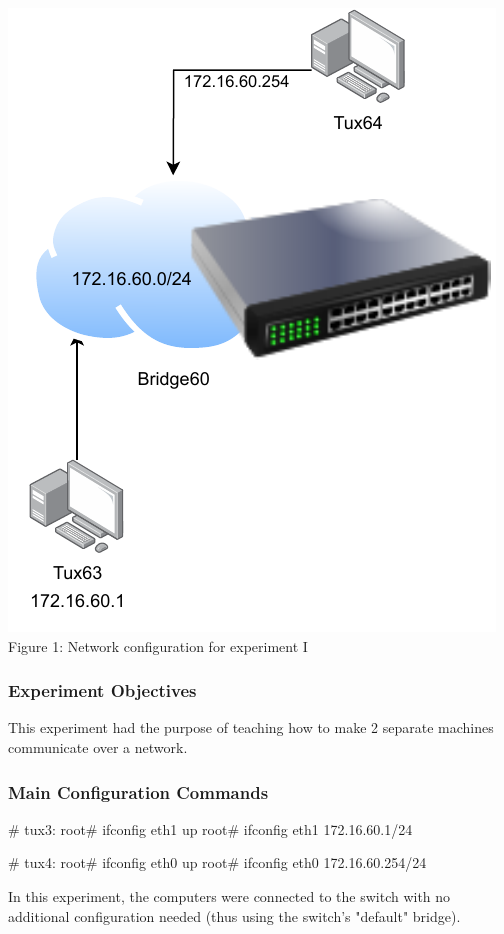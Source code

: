 \documentclass[11pt,a4paper,twocolumn]{article}
\begin{document}
\includegraphics{experiment1}
Figure 1: Network configuration for experiment I
\subsubsection{Experiment Objectives}

This experiment had the purpose of teaching how to make 2 separate machines communicate over a network.

\subsubsection{Main Configuration Commands}

\begin{code-bash}
# tux3:
root# ifconfig eth1 up
root# ifconfig eth1 172.16.60.1/24

# tux4:
root# ifconfig eth0 up
root# ifconfig eth0 172.16.60.254/24

\end{code-bash}

In this experiment, the computers were connected to the switch with no additional configuration needed (thus using the switch's "default" bridge).
\end{document}
